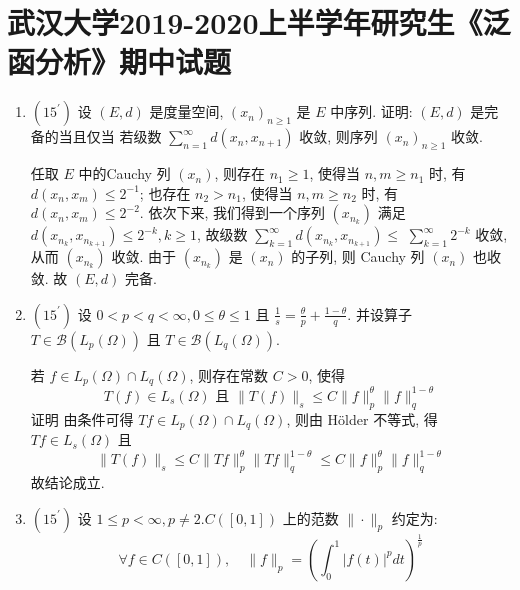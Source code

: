 \section{武汉大学2019-2020上半学年研究生《泛函分析》期中试题}
\begin{enumerate}
    \item $\left(15^{\prime}\right)$ 
    设 $(E, d)$ 是度量空间, $\left(x_{n}\right)_{n \geq 1}$ 是 $E$ 中序列. 证明: $(E, d)$ 是完备的当且仅当 若级数 $\sum_{n=1}^{\infty} d\left(x_{n}, x_{n+1}\right)$ 收敛, 则序列 $\left(x_{n}\right)_{n \geq 1}$ 收敛.
        \begin{answer}[][
            若级数 $\sum_{n=1}^{\infty} d\left(x_{n}, x_{n+1}\right)$ 收敛, 则序列 $\left(x_{n}\right)_{n \geq 1}$ 是 Cauchy 列. 因 $E$ 完备, 故 $\left(x_{n}\right)_{n \geq 1}$ 收敛.]
            任取 $E$ 中的Cauchy 列 $\left(x_{n}\right)$, 则存在 $n_{1} \geq 1$, 使得当 $n, m \geq n_{1}$ 时, 有 $d\left(x_{n}, x_{m}\right) \leq 2^{-1}$; 也存在 $n_{2}>n_{1}$, 使得当 $n, m \geq n_{2}$ 时, 有 $d\left(x_{n}, x_{m}\right) \leq 2^{-2}$. 依次下来, 我们得到一个序列 $\left(x_{n_{k}}\right)$ 满足 $d\left(x_{n_{k}}, x_{n_{k+1}}\right) \leq 2^{-k}, k \geq 1$, 故级数 $\sum_{k=1}^{\infty} d\left(x_{n_{k}}, x_{n_{k+1}}\right) \leq$ $\sum_{k=1}^{\infty} 2^{-k}$ 收敛, 从而 $\left(x_{n_{k}}\right)$ 收敛. 由于 $\left(x_{n_{k}}\right)$ 是 $\left(x_{n}\right)$ 的子列, 则 Cauchy 列 $\left(x_{n}\right)$ 也收 敛. 故 $(E, d)$ 完备.
        \end{answer}
    \item $\left(15^{\prime}\right)$ 设 $0<p<q<\infty, 0 \leq \theta \leq 1$ 且 $\frac{1}{s}=\frac{\theta}{p}+\frac{1-\theta}{q}$. 并设算子 $T \in \mathcal{B}\left(L_{p}(\Omega)\right)$ 且 $T\in\mathcal{B}\left(L_{q}(\Omega)\right)$. 
        \begin{answer}
            若 $f \in L_{p}(\Omega) \cap L_{q}(\Omega)$, 则存在常数 $C>0$, 使得
            \[
                T(f) \in L_{s}(\Omega) \text { 且 }\|T(f)\|_{s} \leq C\|f\|_{p}^{\theta}\|f\|_{q}^{1-\theta} 
            \]
            证明 由条件可得 $T f \in L_{p}(\Omega) \cap L_{q}(\Omega)$, 则由 Hölder 不等式, 得 $T f \in L_{s}(\Omega)$ 且
            \[
            \|T(f)\|_{s} \leq C\|T f\|_{p}^{\theta}\|T f\|_{q}^{1-\theta} \leq C\|f\|_{p}^{\theta}\|f\|_{q}^{1-\theta} 
            \]
            故结论成立.
        \end{answer}
    \item $\left(15^{\prime}\right)$ 设 $1 \leq p<\infty, p \neq  2 . C([0,1])$ 上的范数 $\|\cdot\|_{p}$ 约定为:
    \[
    \forall f \in C([0,1]), \quad\|f\|_{p}=\left(\int_{0}^{1}|f(t)|^{p} d t\right)^{\frac{1}{p}}
\]
\end{enumerate}
